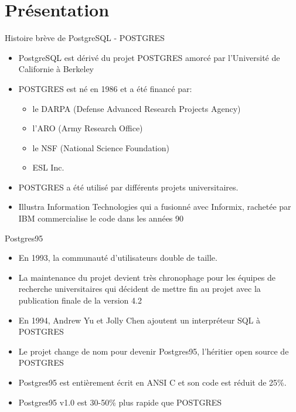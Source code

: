 \section{Présentation}


\begin{frame}[fragile]{Histoire brève de PostgreSQL - POSTGRES}

   \begin{itemize}
      \item PostgreSQL est dérivé du projet POSTGRES amorcé par l'Université de Californie à Berkeley
      \item POSTGRES est né en 1986 et a été financé par:
      \begin{itemize}
         \item le DARPA (Defense Advanced Research Projects Agency)
         \item l'ARO (Army Research Office)
         \item le NSF (National Science Foundation)
         \item ESL Inc.
      \end{itemize}
      \item POSTGRES a été utilisé par différents projets universitaires.
      \item Illustra Information Technologies qui a fusionné avec Informix, rachetée par IBM commercialise le code dans les années 90
   \end{itemize}

\begin{toile}
\end{toile}

\end{frame}


\begin{frame}[fragile]{Postgres95}

   \begin{itemize}
      \item En 1993, la communauté d'utilisateurs double de taille.
      \item La maintenance du projet devient très chronophage pour les équipes de recherche universitaires qui décident de mettre fin au projet avec la publication finale de la version 4.2
      \item En 1994, Andrew Yu et Jolly Chen ajoutent un interpréteur SQL à POSTGRES
      \item Le projet change de nom pour devenir Postgres95, l'héritier open source de POSTGRES
      \item Postgres95 est entièrement écrit en ANSI C et son code est réduit de 25\%.
      \item Postgres95 v1.0 est 30-50\% plus rapide que POSTGRES
   \end{itemize}

\end{frame}


